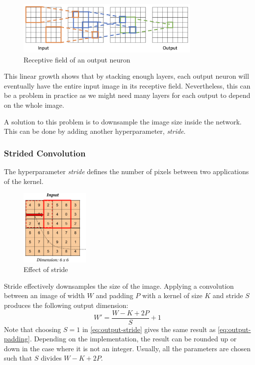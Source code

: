 \begin{figure}[H]
    \centering
    \includegraphics[width=0.8\textwidth]{images/receptive-field.png}
    \caption{Receptive field of an output neuron}
\end{figure}

This linear growth shows that by stacking enough layers, each output neuron will eventually have the entire input image in its receptive field. Nevertheless, this can be a problem in practice as we might need many layers for each output to depend on the whole image.

A solution to this problem is to downsample the image size inside the network. This can be done by adding another hyperparameter, \emph{stride}.

\subsubsection{Strided Convolution}
\begin{definition}[Stride]
    The hyperparameter \emph{stride} defines the number of pixels between two applications of the kernel.
\end{definition}
\begin{figure}[H]
    \centering
    \includegraphics[width=0.3\textwidth]{images/stride.png}
    \caption{Effect of stride}
\end{figure}

Stride effectively downsamples the size of the image. Applying a convolution between an image of width $W$ and padding $P$ with a kernel of size $K$ and stride $S$ produces the following output dimension:
\begin{equation}
    \label{eq:output-stride}
    W'=\frac{W-K+2P}{S}+1
\end{equation}
Note that choosing $S=1$ in \eqref{eq:output-stride} gives the same result as \eqref{eq:output-padding}. Depending on the implementation, the result can be rounded up or down in the case where it is not an integer. Usually, all the parameters are chosen such that $S$ divides $W-K+2P$.

